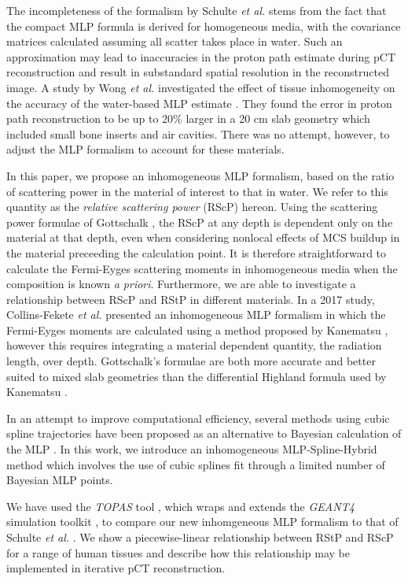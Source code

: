 \documentclass[preprint,times]{elsarticle}
\begin{document}
The incompleteness of the formalism by Schulte \emph{et al.} \citep{penfoldMLP} stems from the fact that the compact MLP formula is derived for homogeneous media, with the covariance matrices calculated assuming all scatter takes place in water. Such an approximation may lead to inaccuracies in the proton path estimate during pCT reconstruction and result in substandard spatial resolution in the reconstructed image. A study by Wong \emph{et al.} investigated the effect of tissue inhomogeneity on the accuracy of the water-based MLP estimate \citep{Wong2009}. They found the error in proton path reconstruction to be up to 20\% larger in a 20 cm slab geometry which included small bone inserts and air cavities. There was no attempt, however, to adjust the MLP formalism to account for these materials. 

In this paper, we propose an inhomogeneous MLP formalism, based on the ratio of scattering power in the material of interest to that in water. We refer to this quantity as the \emph{relative scattering power} (RScP) hereon. Using the scattering power formulae of Gottschalk \citep{gottschalkRadioProtons}, the RScP at any depth is dependent only on the material at that depth, even when considering nonlocal effects of MCS buildup in the material preceeding the calculation point. It is therefore straightforward to calculate the Fermi-Eyges scattering moments \citep{Eyges1948} in inhomogeneous media when the composition is known \emph{a priori}. Furthermore, we are able to investigate a relationship between RScP and RStP in different materials. In a 2017 study, Collins-Fekete \emph{et al.} \citep{Collins2017} presented an inhomogeneous MLP formalism in which the Fermi-Eyges moments are calculated using a method proposed by Kanematsu \citep{Kanematsu2008}, however this requires integrating a material dependent quantity, the radiation length, over depth. Gottschalk's formulae are both more accurate and better suited to mixed slab geometries than the differential Highland formula used by Kanematsu \citep{gottschalkRadioProtons}. 

In an attempt to improve computational efficiency, several methods using cubic spline trajectories have been proposed as an alternative to Bayesian calculation of the MLP \citep{tianfang,wang2011,feketeCSP}. In this work, we introduce an inhomogeneous MLP-Spline-Hybrid method which involves the use of cubic splines fit through a limited number of Bayesian MLP points.

We have used the \emph{TOPAS} tool \citep{TOPAS}, which wraps and extends the \emph{GEANT4} simulation toolkit \citep{geant4}, to compare our new inhomgeneous MLP formalism to that of Schulte \emph{et al.} \citep{penfoldMLP}. We show a piecewise-linear relationship between RStP and RScP for a range of human tissues and describe how this relationship may be implemented in iterative pCT reconstruction.
\end{document}
